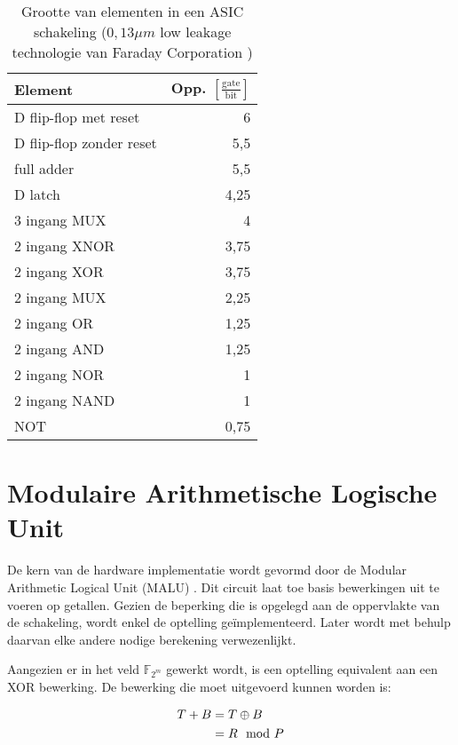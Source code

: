 \begin{table}[h]
	\caption[Oppervlakte van elementen in een ASIC schakeling]{Grootte van elementen in een ASIC schakeling ($0,13 \mu m$ low leakage technologie van Faraday Corporation \cite{cell-databook})}
	\label{tabel-implementatie-beperkingen-elementen-gatecount}

	\centering
	\begin{tabular}{lr}
		\toprule
		Element			& Opp. $\left[\frac{\text{gate}}{\text{bit}}\right]$\\
		\midrule
		D flip-flop met reset	& 6\\
		D flip-flop zonder reset	& 5,5\\
		full adder		& 5,5\\
		D latch			& 4,25\\
		3 ingang MUX	& 4\\
		2 ingang XNOR	& 3,75\\
		2 ingang XOR	& 3,75\\
		2 ingang MUX	& 2,25\\
		2 ingang OR		& 1,25\\
		2 ingang AND	& 1,25\\
		2 ingang NOR	& 1\\
		2 ingang NAND	& 1\\
		NOT				& 0,75\\
		\bottomrule
	\end{tabular}
\end{table}

\section{Modulaire Arithmetische Logische Unit\label{sectie-implementatie-malu}}

De kern van de hardware implementatie wordt gevormd door de Modular Arithmetic Logical Unit (MALU) \cite{sakiyama, batina-lowcost}. Dit circuit laat toe basis bewerkingen uit te voeren op getallen. Gezien de beperking die is opgelegd aan de oppervlakte van de schakeling, wordt enkel de optelling ge\"implementeerd. Later wordt met behulp daarvan elke andere nodige berekening verwezenlijkt.

Aangezien er in het veld $\mathbb{F}_{2^m}$ gewerkt wordt, is een optelling equivalent aan een XOR bewerking. De bewerking die moet uitgevoerd kunnen worden is:

\[\begin{aligned}
T + B	&= T \oplus B\\
		&= R \mod P
\end{aligned}\]

